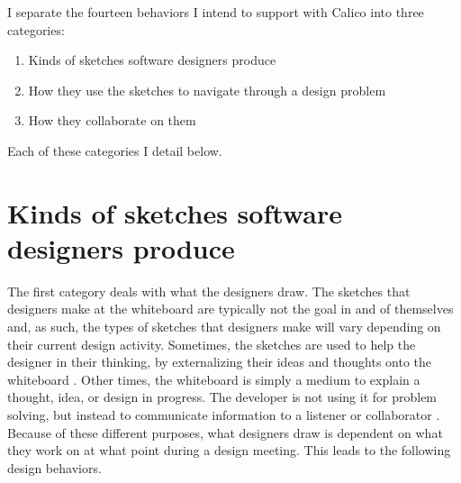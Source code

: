 \documentclass[12pt,fleqn]{ucithesis}
\begin{document}
I separate the fourteen behaviors I intend to support with Calico into three categories:

 \begin{enumerate}
 \item Kinds of sketches software designers produce
 \item How they use the sketches to navigate through a design problem
 \item How they collaborate on them
 \end{enumerate}

Each of these categories I detail below.

\section{Kinds of sketches software designers produce}
\label{chapter:motivation:kinds}

The first category deals with what the designers draw. The sketches that designers make at the whiteboard are typically not the goal in and of themselves and, as such, the types of sketches that designers make will vary depending on their current design activity. Sometimes, the sketches are used to help the designer in their thinking, by externalizing their ideas and thoughts onto the whiteboard \cite{lawson1994design}. Other times, the whiteboard is simply a medium to explain a thought, idea, or design in progress. The developer is not using it for problem solving, but instead to communicate information to a listener or collaborator \cite{eugene1992engineering}. Because of these different purposes, what designers draw is dependent on what they work on at what point during a design meeting. This leads to the following design behaviors.
\end{document}
